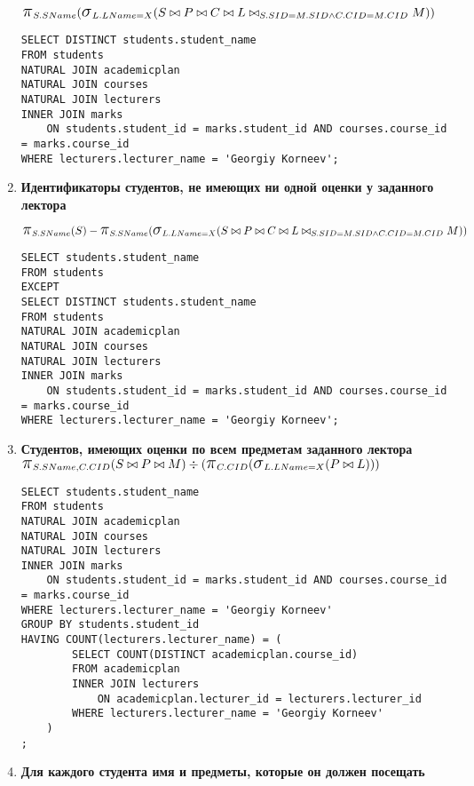 \documentclass[12pt]{article}
\newcommand{\select}{\mbox{\Large$\sigma$}}
\newcommand{\project}{\mbox{\Large$\pi$}}
\begin{document}
\begin{enumerate}
		$ \project_{S.SName} (\select_{L.LName = X } (S \bowtie P \bowtie C \bowtie L \bowtie_{S.SID = M.SID \wedge C.CID = M.CID} M)) $
    
		\begin{verbatim}
SELECT DISTINCT students.student_name
FROM students 
NATURAL JOIN academicplan
NATURAL JOIN courses
NATURAL JOIN lecturers
INNER JOIN marks
	ON students.student_id = marks.student_id AND courses.course_id = marks.course_id
WHERE lecturers.lecturer_name = 'Georgiy Korneev';
		\end{verbatim}
            
    
    \item \textbf{Идентификаторы студентов, не имеющих ни одной оценки у заданного лектора}
    
    		$\project_{S.SName} (S) - \project_{S.SName} (\select_{L.LName = X } (S \bowtie P \bowtie C \bowtie L \bowtie_{S.SID = M.SID \wedge C.CID = M.CID} M)) $
    
		\begin{verbatim}
SELECT students.student_name
FROM students 
EXCEPT
SELECT DISTINCT students.student_name
FROM students 
NATURAL JOIN academicplan
NATURAL JOIN courses
NATURAL JOIN lecturers
INNER JOIN marks
	ON students.student_id = marks.student_id AND courses.course_id = marks.course_id
WHERE lecturers.lecturer_name = 'Georgiy Korneev';
		\end{verbatim}
    
    \item \textbf{Студентов, имеющих оценки по всем предметам заданного лектора}
	    $\project_{S.SName, C.CID}  (S \bowtie P \bowtie M) \div (\project_{C.CID} (\select_{L.LName = X } (P \bowtie L))) $
    
		\begin{verbatim}
SELECT students.student_name
FROM students 
NATURAL JOIN academicplan
NATURAL JOIN courses
NATURAL JOIN lecturers
INNER JOIN marks
	ON students.student_id = marks.student_id AND courses.course_id = marks.course_id
WHERE lecturers.lecturer_name = 'Georgiy Korneev' 
GROUP BY students.student_id
HAVING COUNT(lecturers.lecturer_name) = (
		SELECT COUNT(DISTINCT academicplan.course_id)
		FROM academicplan
		INNER JOIN lecturers
			ON academicplan.lecturer_id = lecturers.lecturer_id
		WHERE lecturers.lecturer_name = 'Georgiy Korneev'
	)
;
		\end{verbatim}
    
    \item \textbf{Для каждого студента имя и предметы, которые он должен посещать}
    

\end{enumerate}
\end{document}
